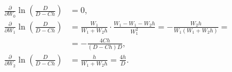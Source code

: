 \documentclass[a4paper,14pt]{article}
\begin{document}
\begin{equation*}
  \begin{aligned}
    \frac{\partial }{\partial W_0} \ln \left(
    \frac{D}{D - C h}
    \right)
    &=
      0, \\
    \frac{\partial }{\partial W_1} \ln \left(
    \frac{D}{D - C h}
    \right)
    &=
      \frac{W_1}{W_1 + W_2 h} \cdot \frac{W_1 - W_1 - W_2 h}{W_1^2}
      = - \frac{W_2 h}{W_1 (W_1 + W_2 h)} = \\
    &=
      - \frac{4 C h}{(D - C h) D}, \\
    \frac{\partial }{\partial W_2} \ln \left(
    \frac{D}{D - C h}
    \right)
    &=
      \frac{h}{W_1 + W_2 h} = \frac{4 h}{D}.
  \end{aligned}
\end{equation*}
\end{document}
